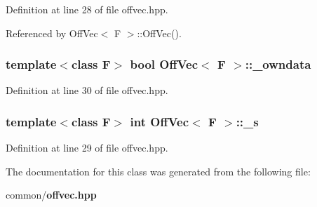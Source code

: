 Definition at line 28 of file offvec.hpp.

Referenced by Off\-Vec$<$ F $>$::Off\-Vec().
\subsubsection{\setlength{\rightskip}{0pt plus 5cm}template$<$class F$>$ bool {\bf Off\-Vec}$<$ F $>$::{\bf \_\-owndata}}\label{classOffVec_4a613b2956a4a0ffff962e497a5d56e0_4a613b2956a4a0ffff962e497a5d56e0}




Definition at line 30 of file offvec.hpp.
\subsubsection{\setlength{\rightskip}{0pt plus 5cm}template$<$class F$>$ int {\bf Off\-Vec}$<$ F $>$::{\bf \_\-s}}\label{classOffVec_c195aeabeeee007891190b9ff8a32c70_c195aeabeeee007891190b9ff8a32c70}




Definition at line 29 of file offvec.hpp.

The documentation for this class was generated from the following file:\begin{CompactItemize}
\item 
common/{\bf offvec.hpp}\end{CompactItemize}
